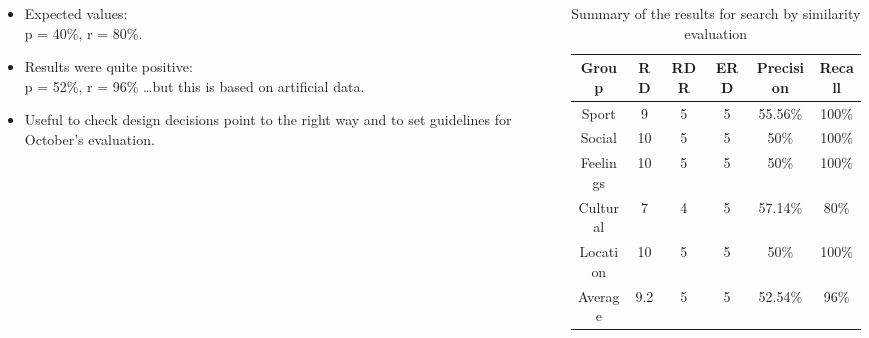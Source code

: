 \begin{frame}

\begin{columns}

	\begin{column}{6cm}
	
	\begin{itemize}
		\item Expected values: \\ p = 40\%, r = 80\%.
		\item Results were quite positive: \\ p = 52\%, r = 96\% \ldots but this is
		based on artificial data.
		\item Useful to check design decisions point to the right way and to set
		guidelines for October's evaluation.
	\end{itemize}
		
	
	\end{column}
	
		\begin{column}{6cm}
	    
\begin{table}[h!]
	\tiny
    \begin{center}
		\begin{tabular}{||c|c|c|c|c|c||}

		\hline \hline
			Group & RD & RDR & ERD & Precision & Recall \\
		\hline \hline
			Sport & 9 & 5 & 5 & 55.56\% & 100\%\\
			\hline
			Social & 10 & 5 & 5 & 50\% & 100\%\\
			\hline
			Feelings & 10 & 5 & 5 & 50\% & 100\%\\
			\hline
			Cultural & 7 & 4 & 5 & 57.14\% & 80\%\\
			\hline
			Location & 10 & 5 & 5 & 50\% & 100\%\\
			\hline
			\hline
			Average & 9.2 & 5 & 5 & 52.54\% & 96\%\\

		\hline \hline

		\end{tabular}
		\caption{\label{table:testing-summary} Summary of the results for search by
		similarity evaluation}
	\end{center}
\end{table}
	    
	    \end{column}
	
\end{columns}

\end{frame}

